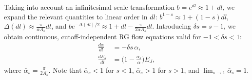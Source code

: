 \documentclass[aps,notitlepage,twocolumn,prl,nolongbibliography,superscriptaddress]{revtex4-2}
\begin{document}
Taking into account an infinitesimal scale transformation $b = e^{dl} \approx 1+dl$, we expand the relevant quantities to linear order in $dl$: $b^{1-s} \approx 1 + (1-s)dl$, $\Delta(dl) \approx \frac{\pi}{\alpha A_s} dl$, and $b e^{-\Delta(dl)/2} \approx 1 + dl - \frac{\pi}{2 \alpha A_s} dl$. Introducing $\delta s = s-1$, we obtain continuous, cutoff-independent RG flow equations valid for $-1 < \delta s < 1$:
\begin{equation}
\begin{split}
    \frac{d \alpha}{dl} &= -\delta s \,\alpha,\\
    \frac{dE_J}{dl} &= \biggl(1-\frac{\bar{\alpha}_s}{ \alpha}\biggr)E_J,
\end{split}
\end{equation}
where $\bar{\alpha}_s = \frac{\pi}{2 A_s}$. Note that $\bar{\alpha}_s < 1$ for $s < 1$, $\bar{\alpha}_s > 1$ for $s > 1$, and $\lim_{s \to 1} \bar{\alpha}_s = 1$.
\end{document}
